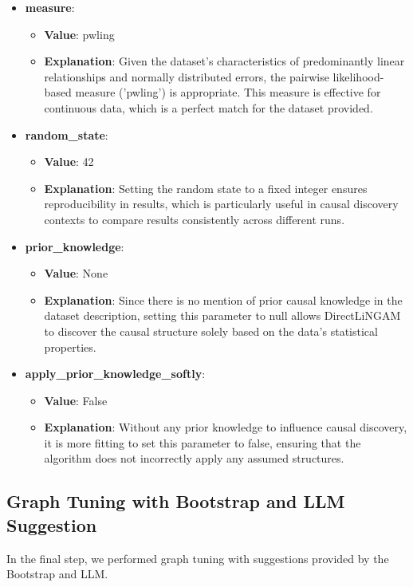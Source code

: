 \documentclass{article}
\begin{document}
\begin{itemize}

\item \textbf{measure}:
\begin{itemize}
    \item \textbf{Value}: pwling
    \item \textbf{Explanation}: Given the dataset's characteristics of predominantly linear relationships and normally distributed errors, the pairwise likelihood-based measure ('pwling') is appropriate. This measure is effective for continuous data, which is a perfect match for the dataset provided.
\end{itemize}

\item \textbf{random\_state}:
\begin{itemize}
    \item \textbf{Value}: 42
    \item \textbf{Explanation}: Setting the random state to a fixed integer ensures reproducibility in results, which is particularly useful in causal discovery contexts to compare results consistently across different runs.
\end{itemize}

\item \textbf{prior\_knowledge}:
\begin{itemize}
    \item \textbf{Value}: None
    \item \textbf{Explanation}: Since there is no mention of prior causal knowledge in the dataset description, setting this parameter to null allows DirectLiNGAM to discover the causal structure solely based on the data's statistical properties.
\end{itemize}

\item \textbf{apply\_prior\_knowledge\_softly}:
\begin{itemize}
    \item \textbf{Value}: False
    \item \textbf{Explanation}: Without any prior knowledge to influence causal discovery, it is more fitting to set this parameter to false, ensuring that the algorithm does not incorrectly apply any assumed structures.
\end{itemize}

\end{itemize}
                    

\subsection{Graph Tuning with Bootstrap and LLM Suggestion}
In the final step, we performed graph tuning with suggestions provided by the Bootstrap and LLM.
            
\end{document}
